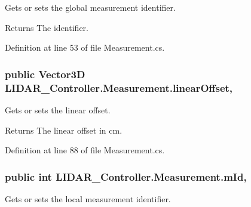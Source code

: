 Gets or sets the global measurement identifier. 

\begin{DoxyReturn}{Returns}
The identifier. 
\end{DoxyReturn}


Definition at line 53 of file Measurement.\+cs.

\subsubsection[{\texorpdfstring{linear\+Offset}{linearOffset}}]{\setlength{\rightskip}{0pt plus 5cm}public Vector3D L\+I\+D\+A\+R\+\_\+\+Controller.\+Measurement.\+linear\+Offset\hspace{0.3cm}{\ttfamily [get]}, {\ttfamily [set]}}\hypertarget{class_l_i_d_a_r___controller_1_1_measurement_a00cfc32b350bb7516008ec96ad557f8d}{}\label{class_l_i_d_a_r___controller_1_1_measurement_a00cfc32b350bb7516008ec96ad557f8d}


Gets or sets the linear offset. 

\begin{DoxyReturn}{Returns}
The linear offset in cm. 
\end{DoxyReturn}


Definition at line 88 of file Measurement.\+cs.

\subsubsection[{\texorpdfstring{m\+Id}{mId}}]{\setlength{\rightskip}{0pt plus 5cm}public int L\+I\+D\+A\+R\+\_\+\+Controller.\+Measurement.\+m\+Id\hspace{0.3cm}{\ttfamily [get]}, {\ttfamily [set]}}\hypertarget{class_l_i_d_a_r___controller_1_1_measurement_ac3e8a45ae2970e9d3a538fbc09c5b60b}{}\label{class_l_i_d_a_r___controller_1_1_measurement_ac3e8a45ae2970e9d3a538fbc09c5b60b}


Gets or sets the local measurement identifier. 

